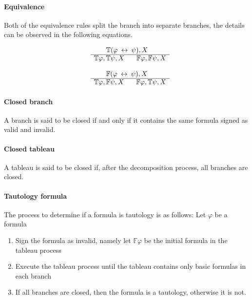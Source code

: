 \documentclass{article}
\begin{document}
		\paragraph{Equivalence}
Both of the equivalence rules split the branch into separate branches, the details can be observed in the following equations.
		\newline
		\noindent\begin{minipage}{.5\linewidth}
		\begin{align*}
			\begin{array}{rl}
				& \:\:\:\:\:\:\:\: \mathbb{T}(\varphi \: \leftrightarrow \: \psi), X \\
			      \cline{2-2}
			      & \mathbb{T}\varphi, \mathbb{T}\psi, X \:\:\:\:\:\:\:\: \mathbb{F}\varphi, \mathbb{F}\psi, X
			\end{array}
		\end{align*}
		\end{minipage}%
		\begin{minipage}{.5\linewidth}
		\begin{align*}
			\begin{array}{rl}
				& \:\:\:\:\:\:\:\: \mathbb{F}(\varphi \: \leftrightarrow \: \psi), X \\
			      \cline{2-2}
			      & \mathbb{T}\varphi, \mathbb{F}\psi, X \:\:\:\:\:\:\:\: \mathbb{F}\varphi, \mathbb{T}\psi, X
			\end{array}
		\end{align*}
		\end{minipage}
		\newline
		\paragraph{Closed branch}
A branch is said to be closed if and only if it contains the same formula signed as valid and invalid.

		\paragraph{Closed tableau}
A tableau is said to be closed if, after the decomposition process, all branches are closed.

		\paragraph{Tautology formula} 
The process to determine if a formula is tautology is as follows:
Let $\varphi$ be a formula 
\begin{enumerate}
	\item Sign the formula as invalid, namely let $\mathbb{F}\varphi$ be the initial formula in the tableau process
	\item Execute the tableau process until the tableau contains only basic formulas in each branch
	\item If all branches are closed, then the formula is a tautology, otherwise it is not.
\end{enumerate}
\end{document}
